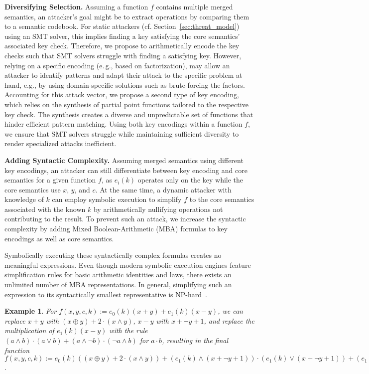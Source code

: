 \documentclass[letterpaper,twocolumn,10pt]{article}
\newcommand{\eg}{e.\,g.,\xspace}
\newcommand{\cf}{cf.\xspace}
\theoremstyle{customexample}
\newtheorem{example}{Example}
\theoremstyle{customexperiment}
\begin{document}
\textbf{Diversifying Selection.}
Assuming a function $f$ contains multiple merged semantics, an attacker's goal might be to extract operations by comparing them to a semantic codebook. For static attackers (\cf Section~\ref{sec:threat_model}) using an SMT solver, this implies finding a key satisfying the core semantics' associated key check.
Therefore, we propose to arithmetically encode the key checks such that SMT solvers struggle with finding a satisfying key. However, relying on a specific encoding (\eg based on factorization), may allow an attacker to identify patterns and adapt their attack to the specific problem at hand, e.g., by using domain-specific solutions such as brute-forcing the factors.
Accounting for this attack vector, we propose a second type of key encoding, which relies on the synthesis of partial point functions tailored to the respective key check. The synthesis creates a diverse and unpredictable set of functions that hinder efficient pattern matching.
Using both key encodings within a function $f$, we ensure that SMT solvers struggle while maintaining sufficient diversity to render specialized attacks inefficient.




\textbf{Adding Syntactic Complexity.}
Assuming merged semantics using different key encodings, an attacker can still differentiate between key encoding and core semantics for a given function $f$, as $e_i(k)$ operates only on the key while the core semantics use $x$, $y$, and $c$. At the same time, a dynamic attacker with knowledge of $k$ can employ symbolic execution to simplify $f$ to the core semantics associated with the known $k$ by arithmetically nullifying operations not contributing to the result. To prevent such an attack, we increase the syntactic complexity by adding Mixed Boolean-Arithmetic (MBA) formulas to key encodings as well as core semantics.

Symbolically executing these syntactically complex formulas creates no meaningful expressions. Even though modern symbolic execution engines feature simplification rules for basic arithmetic identities and laws, there exists an unlimited number of MBA representations. In general, simplifying such an expression to its syntactically smallest representative is NP-hard~\cite{zhou2007information}.

\begin{example}
For $f(x, y, c ,k) := e_0(k)(x+y) + e_1(k)(x-y)$, we can replace $x + y$ with $(x \oplus y) + 2 \cdot (x \land y)$, $x-y$ with $x + \neg y + 1$, and replace the multiplication of $e_1(k)(x-y)$ with the rule $(a\land b)\cdot(a\lor b) + (a\land\neg b)\cdot(\neg a\land b)$ for $a\cdot b$, resulting in the final function $f(x, y, c ,k) := e_0(k)((x \oplus y) + 2 \cdot (x \land y)) + (e_1(k)\land (x + \neg y + 1))\cdot(e_1(k)\lor (x + \neg y + 1)) + (e_1(k)\land\neg (x + \neg y + 1))\cdot(\neg e_1(k) \land(x + \neg y + 1))$.
\end{example}
\end{document}
